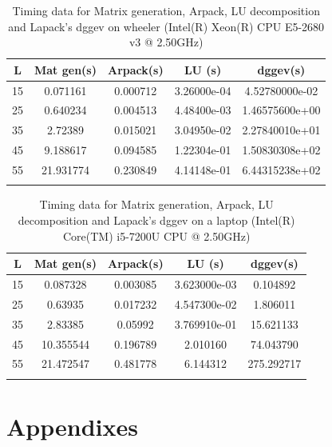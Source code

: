 \documentclass[%
 reprint,
 amsmath,amssymb,
 aps,
]{revtex4-2}
\begin{document}
\begin{table}[h!]
  \centering
  \begin{tabular}{||c | c | c | c| c||}
    \hline
    L  & Mat gen(s) & Arpack(s) & LU (s)      & dggev(s)       \\ [0.5ex]
    \hline\hline
    15 & 0.071161             & 0.000712  & 3.26000e-04 & 4.52780000e-02 \\
    25 & 0.640234             & 0.004513  & 4.48400e-03 & 1.46575600e+00 \\
    35 & 2.72389              & 0.015021  & 3.04950e-02 & 2.27840010e+01 \\
    45 & 9.188617             & 0.094585  & 1.22304e-01 & 1.50830308e+02 \\
    55 & 21.931774            & 0.230849  & 4.14148e-01 & 6.44315238e+02 \\ [1ex]
    \hline
    \label{table:timing_data}
  \end{tabular}
  \caption{Timing data for Matrix generation, Arpack, LU decomposition and Lapack's dggev on wheeler (Intel(R) Xeon(R) CPU E5-2680 v3 @ 2.50GHz)}
\end{table}


\begin{table}[h!]
  \centering
  \begin{tabular}{||c | c | c | c| c||}
    \hline
    L  & Mat gen(s) & Arpack(s) & LU (s)       & dggev(s)  \\ [0.5ex]
    \hline\hline
    15 & 0.087328             & 0.003085  & 3.623000e-03 & 0.104892   \\
    25 & 0.63935              & 0.017232  & 4.547300e-02 & 1.806011   \\
    35 & 2.83385              & 0.05992   & 3.769910e-01 & 15.621133  \\
    45 & 10.355544            & 0.196789  & 2.010160     & 74.043790  \\
    55 & 21.472547            & 0.481778  & 6.144312     & 275.292717 \\ [1ex]
    \hline
    \label{table:timing_data_laptop}
  \end{tabular}
  \caption{Timing data for Matrix generation, Arpack, LU decomposition and Lapack's dggev on a laptop (Intel(R) Core(TM) i5-7200U CPU @ 2.50GHz)}
\end{table}

\section{Appendixes}
\end{document}
